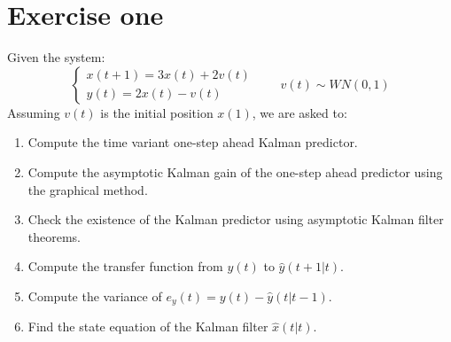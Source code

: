 \section{Exercise one}

Given the system: 
\[\begin{cases}
    x(t+1)=3x(t)+2v(t) \\
    y(t)=2x(t)-v(t)
\end{cases} \qquad v(t) \sim WN(0,1)\]
Assuming $v(t)$ is the initial position $x(1)$, we are asked to:
\begin{enumerate}
    \item Compute the time variant one-step ahead Kalman predictor.
    \item Compute the asymptotic Kalman gain of the one-step ahead predictor using the graphical method.
    \item Check the existence of the Kalman predictor using asymptotic Kalman filter theorems.
    \item Compute the transfer function from $y(t)$ to $\hat{y}(t+1|t)$. 
    \item Compute the variance of $e_y(t)=y(t)-\hat{y}(t|t-1)$. 
    \item Find the state equation of the Kalman filter $\hat{x}(t|t)$. 
\end{enumerate}

